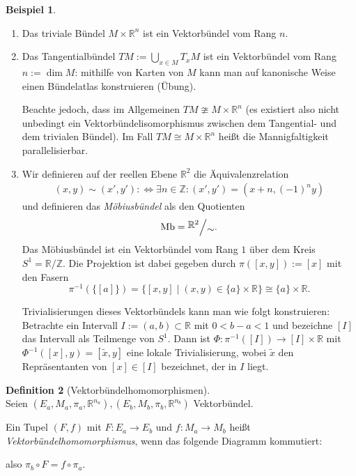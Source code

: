 \documentclass[a4paper]{scrbook}
\numberwithin{equation}{chapter}
\newcommand{\diff}{:\Longleftrightarrow}
\newcommand{\R}{\mathbb{R}}
\theoremstyle{definition}
\newtheorem{defn}{Definition}[section]
\newtheorem{bsp}[defn]{Beispiel}
\begin{document}
		\begin{bsp}\hfill
			\begin{enumerate}[label=(\alph*)]
				\item Das triviale Bündel $M\times \R^n$ ist ein Vektorbündel vom Rang $n$.
				\item Das Tangentialbündel $TM:=\bigcup_{x\in M}T_xM$ ist ein Vektorbündel vom Rang $n:=\dim M$: mithilfe von Karten von $M$ kann man auf kanonische Weise einen Bündelatlas konstruieren (Übung).
				
				Beachte jedoch, dass im Allgemeinen $TM\ncong M\times \R^n$ (es existiert also nicht unbedingt ein Vektorbündelisomorphismus zwischen dem Tangential- und dem trivialen Bündel). Im Fall $TM\cong M\times \R^n$ heißt die Mannigfaltigkeit parallelisierbar.
				\item Wir definieren auf der reellen Ebene $\R^2$ die Äquivalenzrelation
				\begin{align*}
					(x,y) \sim (x',y') \diff \exists n\in\mathbb{Z}: (x',y')=(x+n,(-1)^ny)
				\end{align*}
				und definieren das \emph{Möbiusbündel} als den Quotienten
				\begin{align*}
					\mathrm{Mb}=\raise0.5ex\hbox{$\R^2$} \Big/ \lower0.5ex\hbox{$\sim$}.
				\end{align*}
				Das Möbiusbündel ist ein Vektorbündel vom Rang $1$ über dem Kreis $S^1=\R/\mathbb{Z}$. Die Projektion ist dabei gegeben durch $\pi([x,y]):=[x]$ mit den Fasern \[\pi^{-1}(\{[a]\})=\lbrace [x,y]\mid (x,y)\in \{a\}\times\R\rbrace\cong\{a\}\times\R.\]
				
				Trivialisierungen dieses Vektorbündels kann man wie folgt konstruieren: Betrachte ein Intervall $I:=(a,b)\subset\R$ mit $0< b-a< 1$ und bezeichne $[I]$ das Intervall als Teilmenge von $S^1$. Dann ist $\Phi\colon\pi^{-1}([I])\rightarrow [I]\times \R$ mit $\Phi^{-1}([x],y)=[\tilde{x},y]$ eine lokale Trivialisierung, wobei $\tilde{x}$ den Repräsentanten von $[x]\in [I]$ bezeichnet, der in $I$ liegt.
			\end{enumerate}
		\end{bsp}
		\begin{defn}[Vektorbündelhomomorphismen]\hfill\\
			Seien $(E_a,M_a,\pi_a,\R^{n_a}),(E_b,M_b,\pi_b,\R^{n_b})$ Vektorbündel.
			
			Ein Tupel $(F,f)$ mit $F\colon E_a\rightarrow E_b$ und $f\colon M_a\rightarrow M_b$ heißt \emph{Vektorbündelhomomorphismus}, wenn das folgende Diagramm kommutiert:
			\begin{center}
			\end{center}
			also $\pi_b\circ F=f\circ\pi_a$.
		\end{defn}
		
\end{document}
